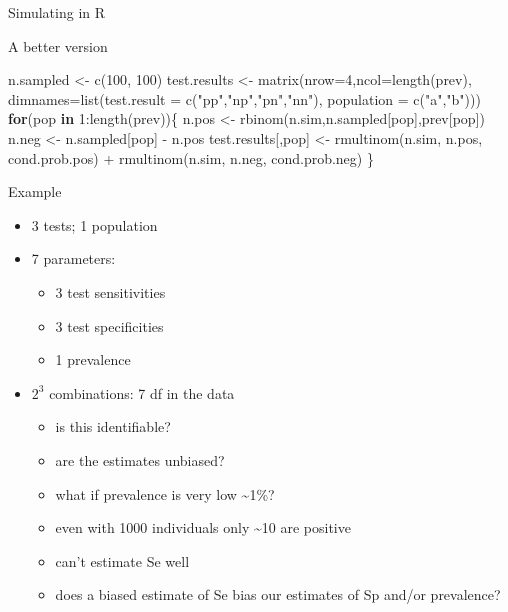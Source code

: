 \documentclass[
  ignorenonframetext,
]{beamer}
\newenvironment{Shaded}{\begin{snugshade}}{\end{snugshade}}
\newcommand{\AttributeTok}[1]{\textcolor[rgb]{0.77,0.63,0.00}{#1}}
\newcommand{\ControlFlowTok}[1]{\textcolor[rgb]{0.13,0.29,0.53}{\textbf{#1}}}
\newcommand{\DecValTok}[1]{\textcolor[rgb]{0.00,0.00,0.81}{#1}}
\newcommand{\FunctionTok}[1]{\textcolor[rgb]{0.00,0.00,0.00}{#1}}
\newcommand{\NormalTok}[1]{#1}
\newcommand{\OtherTok}[1]{\textcolor[rgb]{0.56,0.35,0.01}{#1}}
\newcommand{\SpecialCharTok}[1]{\textcolor[rgb]{0.00,0.00,0.00}{#1}}
\newcommand{\StringTok}[1]{\textcolor[rgb]{0.31,0.60,0.02}{#1}}
\providecommand{\tightlist}{%
  \setlength{\itemsep}{0pt}\setlength{\parskip}{0pt}}
\begin{document}
\begin{frame}[fragile]{Simulating in R}
\begin{block}{A better version}
\begin{Shaded}
\begin{Highlighting}[]
\NormalTok{  n.sampled }\OtherTok{\textless{}{-}} \FunctionTok{c}\NormalTok{(}\DecValTok{100}\NormalTok{, }\DecValTok{100}\NormalTok{)}
\NormalTok{  test.results }\OtherTok{\textless{}{-}} \FunctionTok{matrix}\NormalTok{(}\AttributeTok{nrow=}\DecValTok{4}\NormalTok{,}\AttributeTok{ncol=}\FunctionTok{length}\NormalTok{(prev), }\AttributeTok{dimnames=}\FunctionTok{list}\NormalTok{(}\AttributeTok{test.result =} \FunctionTok{c}\NormalTok{(}\StringTok{"pp"}\NormalTok{,}\StringTok{"np"}\NormalTok{,}\StringTok{"pn"}\NormalTok{,}\StringTok{"nn"}\NormalTok{), }\AttributeTok{population =} \FunctionTok{c}\NormalTok{(}\StringTok{"a"}\NormalTok{,}\StringTok{"b"}\NormalTok{)))}
  \ControlFlowTok{for}\NormalTok{(pop }\ControlFlowTok{in} \DecValTok{1}\SpecialCharTok{:}\FunctionTok{length}\NormalTok{(prev))\{}
\NormalTok{    n.pos }\OtherTok{\textless{}{-}} \FunctionTok{rbinom}\NormalTok{(n.sim,n.sampled[pop],prev[pop])}
\NormalTok{    n.neg }\OtherTok{\textless{}{-}}\NormalTok{ n.sampled[pop] }\SpecialCharTok{{-}}\NormalTok{ n.pos}
\NormalTok{    test.results[,pop] }\OtherTok{\textless{}{-}} \FunctionTok{rmultinom}\NormalTok{(n.sim, n.pos, cond.prob.pos) }\SpecialCharTok{+} 
      \FunctionTok{rmultinom}\NormalTok{(n.sim, n.neg, cond.prob.neg)}
\NormalTok{  \}}
\end{Highlighting}
\end{Shaded}
\end{block}
\end{frame}

\begin{frame}{Example}
\protect\hypertarget{example}{}
\begin{itemize}
\tightlist
\item
  3 tests; 1 population
\item
  7 parameters:

  \begin{itemize}
  \tightlist
  \item
    3 test sensitivities
  \item
    3 test specificities
  \item
    1 prevalence
  \end{itemize}
\item
  \(2^3\) combinations: 7 df in the data

  \begin{itemize}
  \tightlist
  \item
    is this identifiable?
  \item
    are the estimates unbiased?
  \item
    what if prevalence is very low \textasciitilde1\%?
  \item
    even with 1000 individuals only \textasciitilde10 are positive
  \item
    can't estimate Se well
  \item
    does a biased estimate of Se bias our estimates of Sp and/or
    prevalence?
  \end{itemize}
\end{itemize}
\end{frame}
\end{document}
